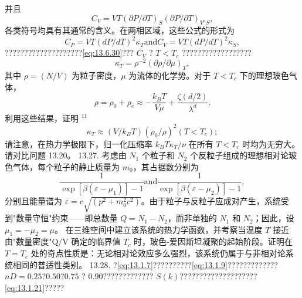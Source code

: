 并且
\begin{equation}\tag{13.7.53}\label{eq:13.7.53}
C _ { V } = V T ( \partial P / \partial T ) _ { S } ( \partial P / \partial T ) _ { V ^{\kappa} S } ,
\end{equation}
各类符号均具有其通常的含义。在两相区域，这些公式的形式为
\begin{equation}\tag{13.7.54}\label{eq:13.7.54}
C _ { P } = V T ( d P / d T ) ^{2} \kappa _ { T }  \mathrm { a n d }  C _ { V } = V T ( d P / d T ) ^{2} \kappa _ { S } ,
\end{equation}
????????????????????\autoref{eq:13.6.30}??? \(C_V\) ? \(T < T_c\) ??????????????????
\begin{equation}\tag{13.7.55}\label{eq:13.7.55}
\kappa _ { T } = \rho ^{- 2} ( \partial \rho / \partial \mu ) _ { T } ,
\end{equation}
其中 \(\rho = (N/V)\) 为粒子密度，\(\mu\) 为流体的化学势。对于 \(T < T_{c}\) 下的理想玻色气体，
\begin{equation}\tag{13.7.56}\label{eq:13.7.56}
\rho = \rho _ { 0 } + \rho _ { e } \approx - \frac { k _ { B } T } { V \mu } + \frac { \zeta ( d / 2 ) } { \lambda ^{d} } .
\end{equation}
利用这些结果，证明 \(^{11}\)
\begin{equation}\tag{13.7.57}\label{eq:13.7.57}
\kappa _ { T } \approx ( V / k _ { B } T ) ( \rho _ { 0 } / \rho ) ^{2}  ( T < T _ { c } ) ;
\end{equation}
请注意，在热力学极限下，归一化压缩率 \(k_{B}T\kappa_{T}/\nu\) 在所有 \(T < T_{c}\) 时均为无穷大。请对比问题 13.20。
13.27. 考虑由 \(N_{1}\) 个粒子和 \(N_{2}\) 个反粒子组成的理想相对论玻色气体，每个粒子的静止质量为 \(m_{0}\)，其占据数分别为
\begin{equation}\tag{13.7.58}\label{eq:13.7.58}
\frac { 1 } { \exp [ \beta ( \varepsilon - \mu _ { 1 } ) ] - 1 }  \mathrm { a n d }  \frac { 1 } { \exp [ \beta ( \varepsilon - \mu _ { 2 } ) ] - 1 } ,
\end{equation}
分别且能量谱为 \(\varepsilon = c\sqrt{(p^2 + m_0^2c^2)}\)。由于粒子与反粒子应成对产生，系统受到"数量守恒"约束——即总数量 \(Q = N_1 - N_2\)，而非单独的 \(N_1\) 和 \(N_2\)；因此，设 \(\mu_1 = -\mu_2 = \mu\)。
在三维空间中建立该系统的热力学函数，并考察当温度 \(T\) 接近由"数量密度"Q/V 确定的临界值 \(T_{c}\) 时，玻色-爱因斯坦凝聚的起始阶段。证明在 \(T = T_{c}\) 处的奇点性质是：无论相对论效应多么强烈，该系统仍属于与非相对论系统相同的普适性类别。
13.28. ?\autoref{eq:13.1.7}??????????\autoref{eq:13.1.9}????????????? \(nD = 0.25\)?\(0.50\)?\(0.75\) ? \(0.90\)????????????? \(S(k)\)????????????????????\autoref{eq:13.1.21}?????
